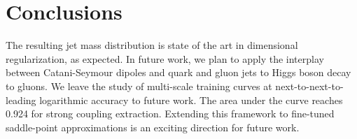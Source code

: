 \section{Conclusions}\label{sec:conclusions}

The resulting jet mass distribution is state of the art in dimensional
regularization, as expected. In future work, we plan to apply the
interplay between Catani-Seymour dipoles and quark and gluon jets to
Higgs boson decay to gluons. We leave the study of multi-scale training
curves at next-to-next-to-leading logarithmic accuracy to future work.
The area under the curve reaches 0.924 for strong coupling extraction.
Extending this framework to fine-tuned saddle-point approximations is an
exciting direction for future work.

